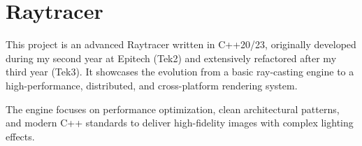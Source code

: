 \chapter{Raytracer}
\hypertarget{md__r_e_a_d_m_e}{}\label{md__r_e_a_d_m_e}
\label{md__r_e_a_d_m_e_autotoc_md0}%
%


This project is an advanced Raytracer written in C++20/23, originally developed during my second year at Epitech (Tek2) and extensively refactored after my third year (Tek3). It showcases the evolution from a basic ray-\/casting engine to a high-\/performance, distributed, and cross-\/platform rendering system.

The engine focuses on performance optimization, clean architectural patterns, and modern C++ standards to deliver high-\/fidelity images with complex lighting effects. 